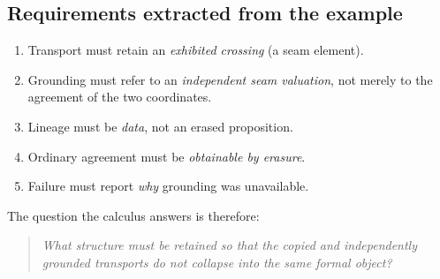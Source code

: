 \subsection{Requirements extracted from the example}
\begin{enumerate}
\item Transport must retain an \emph{exhibited crossing} (a seam element).
\item Grounding must refer to an \emph{independent seam valuation}, not merely to the agreement of the two coordinates.
\item Lineage must be \emph{data}, not an erased proposition.
\item Ordinary agreement must be \emph{obtainable by erasure}.
\item Failure must report \emph{why} grounding was unavailable.
\end{enumerate}
The question the calculus answers is therefore:
\begin{quote}
\emph{What structure must be retained so that the copied and independently grounded transports do not collapse into the same formal object?}
\end{quote}
